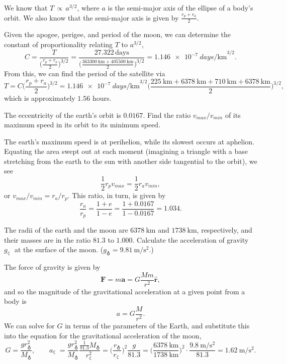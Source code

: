 \documentclass[../feynman-lectures-on-physics.tex]{subfiles}
\begin{document}
\begin{questions}
	\begin{solution}
		We know that $T\, \propto\, a^{3/2}$, where $a$ is the semi-major axis of the ellipse of a body's orbit. We also know that the semi-major axis is given by $\frac{r_p + r_a}{2}$.

		Given the apogee, perigee, and period of the moon, we can determine the constant of proportionality relating $T$ to $a^{3/2}$, 
		\[
		C = \frac{T}{\Big(\frac{r_p+r_a}{2}\Big)^{3/2}}	= \frac{27.322\,\text{days}}{\Big(\frac{\SI{363300}{\kilo\meter} + \SI{405500}{\kilo\meter}}{2}\Big)^{3/2}} = \SI{1.146e-7}{days\per\kilo\meter}^{3/2}
		.\] 
		From this, we can find the period of the satellite via
		\[
			T = C\Big(\frac{r_p + r_a}{2}\Big)^{3/2} = \SI{1.146e-7}{days\per\kilo\meter}^{3/2}\Big(\frac{\SI{225}{\kilo\meter} + \SI{6378}{\kilo\meter} + \SI{710}{\kilo\meter} + \SI{6378}{\kilo\meter}}{2}\Big)^{3/2},
		\] 
		which is approximately $1.56$ hours.
	\end{solution}

	\question The eccentricity of the earth's orbit is $0.0167$. Find the ratio $v_{max}/v_{min}$ of its maximum speed in its orbit to its minimum speed.

	\begin{solution}
		The earth's maximum speed is at perihelion, while its slowest occurs at aphelion. Equating the area swept out at each moment (imagining a triangle with a base stretching from the earth to the sun with another side tangential to the orbit), we see
		\[
			\frac{1}{2}r_pv_{max} = \frac{1}{2}r_av_{min},
		\] 
		or $v_{max}/v_{min} = r_a/r_p$. This ratio, in turn, is given by
		\[
		\frac{r_a}{r_p} = \frac{1 + e}{1 - e} = \frac{1 + 0.0167}{1 - 0.0167} = 1.034
		.\] 
	\end{solution}

	\question The radii of the earth and the moon are $\SI{6378}{\kilo\meter}$ and $\SI{1738}{\kilo\meter}$, respectively, and their masses are in the ratio $81.3$ to $1.000$. Calculate the acceleration of gravity $g_{\leftmoon}$ at the surface of the moon. ($g_{\varEarth} = \SI{9.81}{\meter\per\second\squared}$.)

	\begin{solution}
		The force of gravity is given by
		\[
			\mathbf{F} = m\mathbf{a} = G\frac{Mm}{r^2}\hat{\mathbf{r}},
		\] 
		and so the magnitude of the gravitational acceleration at a given point from a body is
		\[
			a = G\frac{M}{r^2}
		.\] 
		We can solve for $G$ in terms of the parameters of the Earth, and substitute this into the equation for the gravitational acceleration of the moon,
		\[
		G = \frac{gr_\varEarth^2}{M_\varEarth}, \qquad a_\leftmoon = \frac{gr_\varEarth^2}{M_\varEarth}\frac{\frac{1}{81.3}M_\varEarth}{r_\leftmoon^2} = \Big(\frac{r_\varEarth}{r_\leftmoon}\Big)^2\frac{g}{81.3} = \Big(\frac{\SI{6378}{\kilo\meter}}{\SI{1738}{\kilo\meter}}\Big)^2\cdot\frac{\SI{9.8}{\meter\per\second\squared}}{81.3} = \SI{1.62}{\meter\per\second\squared}
		.\] 
	\end{solution}


\end{questions}
\end{document}
